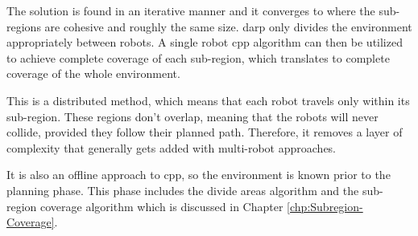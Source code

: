 The solution is found in an iterative manner and it converges to where the sub-regions are cohesive and roughly the same size. \acs{darp} only divides the environment appropriately between robots. A single robot \acs{cpp} algorithm can then be utilized to achieve complete coverage of each sub-region, which translates to complete coverage of the whole environment.

This is a distributed method, which means that each robot travels only within its sub-region. These regions don't overlap, meaning that the robots will never collide, provided they follow their planned path. Therefore, it removes a layer of complexity that generally gets added with multi-robot approaches. 

It is also an offline approach to \acs{cpp}, so the environment is known prior to the planning phase. This phase includes the divide areas algorithm and the sub-region coverage algorithm which is discussed in Chapter \ref{chp:Subregion-Coverage}. 
